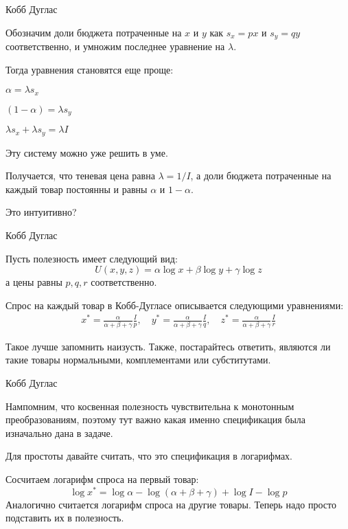 \documentclass{beamer}
\begin{document}
\begin{frame}{Кобб Дуглас}

Обозначим доли бюджета потраченные на $x$ и $y$ как $s_x= px$ и $s_y = qy$ соответственно, и умножим последнее уравнение на $\lambda$. 

Тогда уравнения становятся еще проще:

$\alpha = \lambda s_x$

$(1-\alpha) = \lambda s_y$

$\lambda s_x + \lambda s_y = \lambda I$

Эту систему можно уже решить в уме. 

Получается, что теневая цена равна $\lambda = 1/I$, а доли бюджета потраченные на каждый товар постоянны и равны $\alpha$ и $1-\alpha$.

Это интуитивно?

\end{frame}

\begin{frame}{Кобб Дуглас}

Пусть полезность имеет следующий вид:
$$U(x,y,z) = \alpha \log x + \beta \log y + \gamma \log z$$ 
а цены равны $p, q, r$ соответственно.

Спрос на каждый товар в Кобб-Дугласе описывается следующими уравнениями:
\begin{gather*}
x^{\ast} = \frac{\alpha}{\alpha + \beta + \gamma} \frac{I}{p}, \quad
y^{\ast} = \frac{\alpha}{\alpha + \beta + \gamma} \frac{I}{q}, \quad
z^{\ast} = \frac{\alpha}{\alpha + \beta + \gamma} \frac{I}{r}
\end{gather*}

Такое лучше запомнить наизусть. Также, постарайтесь ответить, являются ли такие товары нормальными, комплементами или субститутами.

\end{frame}

\begin{frame}{Кобб Дуглас}

Нампомним, что косвенная полезность чувствительна к монотонным преобразованиям, поэтому тут важно какая именно спецификация была изначально дана в задаче. 

Для простоты давайте считать, что это спецификация в логарифмах.

Сосчитаем логарифм спроса на первый товар:
$$\log x^{\ast} = \log \alpha - \log (\alpha + \beta + \gamma) + \log I - \log p$$
Аналогично считается логарифм спроса на другие товары. Теперь надо просто подставить их в полезность.

\end{frame}
\end{document}
